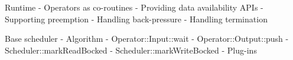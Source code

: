 
Runtime 
- Operators as co-routines
- Providing data availability APIs
- Supporting preemption
- Handling back-pressure
- Handling termination

Base scheduler
 - Algorithm
  - Operator::Input::wait
  - Operator::Output::push 
  - Scheduler::markReadBocked
  - Scheduler::markWriteBocked
 - Plug-ins

